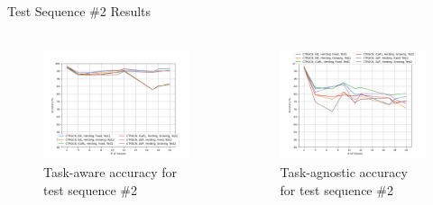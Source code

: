 \documentclass[aspectratio=169, xcolor=dvipsnames]{beamer}
\begin{document}
\begin{frame}{Test Sequence \#2 Results}
      \framesubtitle{}%
      
      \begin{columns}
      \begin{figure}[ht!]
            \centering
            \includegraphics[width=\textwidth]{images/test_seq2_TAw_Acc.png}
            \caption{Task-aware accuracy for test sequence \#2}
      \end{figure}
      
      \begin{figure}[ht!]
            \centering
            \includegraphics[width=\textwidth]{images/test_seq2_TAg_Acc.png}
            \caption{Task-agnostic accuracy for test sequence \#2}
      \end{figure} 
      \end{columns}
\end{frame}
\end{document}
